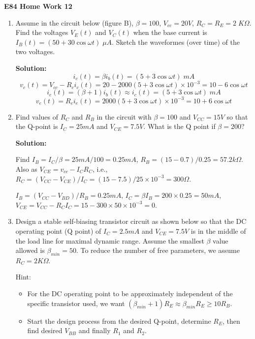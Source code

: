 \usepackage{html}

\begin{center}
{\Large \bf  E84 Home Work 12}
\end{center}
\begin{enumerate}

\item Assume in the circuit below (figure B), $\beta=100$, $V_{cc}=20V$, 
$R_C=R_E=2\;K\Omega$.  Find the voltages $V_E(t)$ and $V_C(t)$ when 
the base current is $I_B(t)=(50+30 \cos \omega t)\;\mu A$. Sketch the
waveformes (over time) of the two voltages.


{\bf Solution:}
 \[ i_c(t)=\beta i_b(t)=(5+3\cos \omega t)\;mA \]
 \[ v_c(t)=V_{cc}-R_c i_c(t)=20-2000 (5+3\cos \omega t)\times 10^{-3}
   =10-6\cos \omega t  \]
 \[ i_e(t)=(\beta+1) i_b(t)\approx i_c(t)=(5+3\cos \omega t)\;mA \]
 \[ v_e(t)=R_e i_e(t)=2000 (5+3\cos \omega t)\times 10^{-3}
    =10+6\cos \omega t  \]

\item Find values of $R_C$ and $R_B$ in the circuit with $\beta=100$
and $V_{CC}=15V$ so that the Q-point is $I_C=25mA$ and $V_{CE}=7.5V$.
What is the Q point if $\beta=200$?


{\bf Solution:}

 Find $I_B=I_C/\beta=25mA/100=0.25mA$, $R_B=(15-0.7)/0.25=57.2k\Omega$.
 Also as $V_{CE}=v_{cc}-I_C R_C$, i.e., $R_C=(V_{CC}-V_{CE})/I_C=
 (15-7.5)/25\times 10^{-3}=300\Omega$. 
 
 $I_B=(V_{CC}-V_{BD})/R_B=0.25mA$, $I_C=\beta I_B=200\times 0.25=50mA$,
 $V_{CE}=V_{CC}-R_C I_C=15-300\times 50\times 10^{-3}=0$.

\item Design a stable self-biasing transistor circuit as shown below
so that the DC operating point (Q point) of $I_C=2.5mA$ and $V_{CE}=7.5V$ 
is in the middle of the load line for maximal dynamic range. Assume 
the smallest $\beta$ value allowed is $\beta_{min}=50$. To reduce the 
number of free parameters, we assume $R_C=2K\Omega$. 

Hint: 
\begin{itemize}
\item For the DC operating point to be approximately independent of the
  specific transistor used, we want $(\beta_{min}+1)R_E\approx 
  \beta_{min} R_E \ge 10 R_B$.
\item Start the design process from the desired Q-point, determine $R_E$,
then find desired $V_{BB}$ and finally $R_1$ and $R_2$.
\end{itemize}


\end{enumerate}
